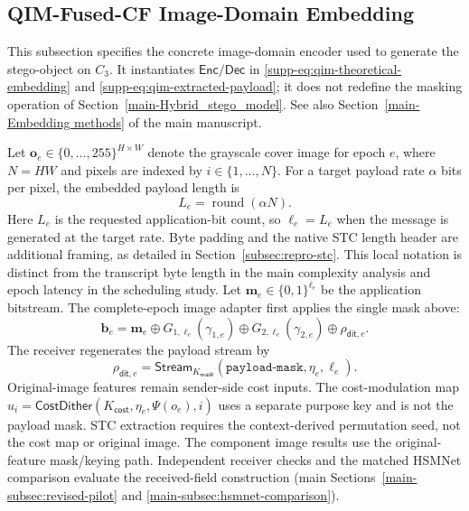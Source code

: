 \documentclass[journal]{IEEEtran}
\theoremstyle{definition}
\theoremstyle{game}
\begin{document}
\subsection{QIM-Fused-CF Image-Domain Embedding}
\label{subsec:ours-qim-fused-cf}

This subsection specifies the concrete image-domain encoder used
to generate the stego-object on $C_3$. It instantiates
$\mathsf{Enc}/\mathsf{Dec}$ in
\eqref{supp-eq:qim-theoretical-embedding} and
\eqref{supp-eq:qim-extracted-payload}; it does not redefine the
masking operation of
Section~\ref{main-Hybrid_stego_model}. See also
Section~\ref{main-Embedding methods} of the main manuscript.

Let
$\mathbf{o}_e\in\{0,\ldots,255\}^{H\times W}$ denote the
grayscale cover image for epoch $e$, where $N=HW$ and pixels are
indexed by $i\in\{1,\ldots,N\}$. For a target payload rate
$\alpha$ bits per pixel, the embedded payload length is
\begin{equation}
L_e
=
\operatorname{round}(\alpha N).
\label{eq:qim_payload_length}
\end{equation}
Here $L_e$ is the requested application-bit count, so $\ell_e=L_e$
when the message is generated at the target rate. Byte padding and the
native STC length header are additional framing, as detailed in
Section~\ref{subsec:repro-stc}. This local notation is distinct from the
transcript byte length in the main complexity analysis and epoch latency
in the scheduling study.
Let $\mathbf m_e\in\{0,1\}^{\ell_e}$ be the application bitstream.
The complete-epoch image adapter first applies the single mask above:
\begin{equation}\label{eq:qim_masked_payload}
\mathbf b_e=\mathbf m_e\oplus G_{1,\ell_e}(\gamma_{1,e})
 \oplus G_{2,\ell_e}(\gamma_{2,e})\oplus\rho_{\mathsf{dit},e}.
\end{equation}
The receiver regenerates the payload stream by
\begin{equation}\label{eq:qim_dither_stream}
\rho_{\mathsf{dit},e}=\mathsf{Stream}_{K_{\mathsf{mask}}}
(\texttt{payload-mask},\eta_e,\ell_e).
\end{equation}
Original-image features remain sender-side cost inputs. The cost-modulation
map $u_i=\mathsf{CostDither}(K_{\mathsf{cost}},\eta_e,\Psi(o_e),i)$ uses a
separate purpose key and is not the payload mask. STC extraction requires
the context-derived permutation seed, not the cost map or original image.
The component image results use the original-feature mask/keying path.
Independent receiver checks and the matched HSMNet comparison evaluate the
received-field construction (main Sections~\ref{main-subsec:revised-pilot}
and \ref{main-subsec:hsmnet-comparison}).
\end{document}
